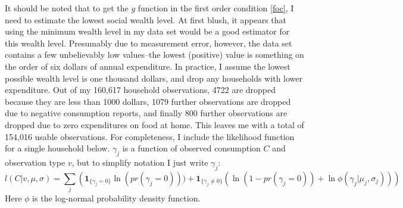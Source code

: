 \documentclass{article}
\begin{document}
%
It should be noted that to get the $g$ function in the first order condition \eqref{foc}, I need to estimate the lowest social wealth level. 
At first blush, it appears that using the minimum wealth level in my data set would be a good estimator for this wealth level.
Presumably due to measurement error, however, the data set contains a few unbelievably low values--the lowest (positive) value is something on the order of six dollars of annual expenditure.
In practice, I assume the lowest possible wealth level is one thousand dollars, and drop any households with lower expenditure.
Out of my 160,617 household observations, 4722 are dropped because they are less than 1000 dollars, 1079 further observations are dropped due to negative consumption reports, and finally 800 further observations are dropped due to zero expenditures on food at home.
This leaves me with a total of 154,016 usable observations.
For completeness, I include the likelihood function for a single household below.  $\gamma_j$ is a function of observed consumption $C$ and observation type $v$, but to simplify notation I just write $\gamma_j$:
\begin{equation}
	\label{lik1}
	l(C|v,\mu,\sigma) = \sum_{j} \left(\mathbf{1}_{\{\gamma_j = 0\}}\ln\left(pr(\gamma_j=0)\right)) + \mathbf{1}_{\{\gamma_j \neq 0\}} \left(\ln\left(1-pr(\gamma_j = 0)\right)+\ln \phi(\gamma_j|\mu_j,\sigma_j)\right)\right)
\end{equation}
Here $\phi$ is the log-normal probability density function.
\end{document}
